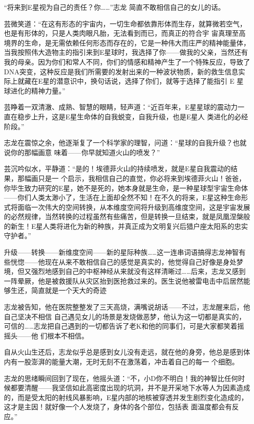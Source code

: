 \documentclass{article}
\begin{document}
“将来到E星视为自己的责任？你……”志龙
简直不敢相信自己的女儿的话。 

芸微笑道：“在这有形态的宇宙内，一切生命都依靠形体而生存，就算微若空气，也是有形体的，只是人类肉眼凡胎，无法看到而已，而真正的符合宇
\newpage
宙真理至高境界的生命，是无需依赖任何形态而存在的，它是一种伟大而庄严的精神能量体，当我按照伟大造物主的指引来到E星球时，我选择了你——做我的父亲，当然还有我的母亲。因为你们和常人不同，你们的情感和精神产生了一个特殊反应，导致了DNA突变，这种反应是我们所需要的发射出来的一种波状物质，新的救生信息实际上就藏在E星的潜意识中，换句话说，选择了你们，就等于选择了能指引 E
星球进化的精神力量。” 

芸睁着一双清澈、成熟、智慧的眼睛，轻声道：“近百年来，E星星球的震动力一直在稳步上升，这是E星生命体的自我蜕变，自我升级，也是E星人
类进化的必经阶段。” 

志龙在震惊之余，他逐渐复了一个科学家的理智，问道：“星球的自我升级？也就说你的那幅画意
味着——你早就知道火山的喷发？” 

芸沉吟似水，平静道：“是的！埃德菲火山的持续喷发，就是E星自我震动的结果，那幅画只是一
\newpage
个启示，我相信自己的直觉，你必将来到埃德菲火山！爸爸，你毕生致力研究的E星，她不是死的，她本身就是生命，是一种星球型宇宙生命体——你们人类太渺小了，生活在上面却全然不知！在不久的将来，E星这种生命形式将面临一次伟大的空间转换，从本维度空间将升级到高维度空间，这是宇宙发展的必然规律，当然转换的过程虽然有些痛苦，但是转换一旦结束，就是凤凰涅槃般的新生！E星人类将进化为新的种族，并真正成为文明复兴后猎户座太阳系的忠实
守护者。” 

升级——转换——新维度空间——新的星际种族……这一连串词语搞得志龙神智有些恍惚——他现在从来不敢相信自己的感觉是真实的，他觉得自己好像是身处梦境，但又强烈地感到自己的中枢神经从来就没有这样清晰过……后来，志龙又感到一阵晕厥，他是被救援队从灾区抬到医抢救过来的。医生说他被雷电击中后居然能够生还，简直就是一个天大的奇迹

志龙被告知，他在医院整整发了三天高烧，满嘴说胡话——不过，志龙醒来后，他自己坚决不相信
\newpage
自己遇见女儿的场景是发烧做恶梦，他认为这一切都是真实的，可信的……志龙把自己遇到的一切都告诉了老K和他的同事们，可是大家都笑着摇摇头——他
们根本不相信。 

自从火山生还后，志龙似乎总是感到女儿没有走远，就在他的身旁，他总是感到体内有一股澎湃的能量大潮，无时无刻不在激荡着，冲击着自己的每一
个细胞。 

志龙的思绪瞬间回到了现在，他摇头道：“不，小D你不明白！我的神智比任何时候都要清醒——我坚信如此高密度出现的坑洞，并不是开采地下水等人为因素造成的，而是受太阳的射线风暴影响，E星内部的地核被穿透并发生剧烈变化造成的，这才是主因！就好像一个人发烧了，身体的各个部位，包括表
面温度都会有反应。” 
\end{document}
